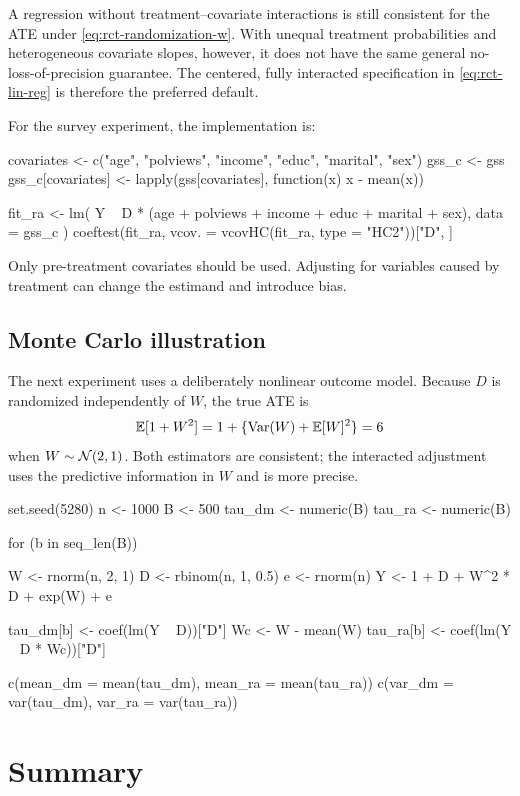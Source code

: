 A regression without treatment--covariate interactions is still consistent for the
ATE under \eqref{eq:rct-randomization-w}.  With unequal treatment probabilities and
heterogeneous covariate slopes, however, it does not have the same general
no-loss-of-precision guarantee.  The centered, fully interacted specification in
\eqref{eq:rct-lin-reg} is therefore the preferred default.

For the survey experiment, the implementation is:
\begin{rcode}
covariates <- c("age", "polviews", "income", "educ", "marital", "sex")
gss_c <- gss
gss_c[covariates] <- lapply(gss[covariates], function(x) x - mean(x))

fit_ra <- lm(
  Y ~ D * (age + polviews + income + educ + marital + sex),
  data = gss_c
)
coeftest(fit_ra, vcov. = vcovHC(fit_ra, type = "HC2"))["D", ]
\end{rcode}

Only pre-treatment covariates should be used.  Adjusting for variables caused by
treatment can change the estimand and introduce bias.

\subsection{Monte Carlo illustration}

The next experiment uses a deliberately nonlinear outcome model.  Because $D$ is
randomized independently of $W$, the true ATE is
\[
  \mathbb{E}[1+W^2]=1+\{\operatorname{Var}(W)+\mathbb{E}[W]^2\}=6
\]
when $W\sim\mathcal{N}(2,1)$.  Both estimators are consistent; the interacted adjustment uses
the predictive information in $W$ and is more precise.

\begin{rcode}
set.seed(5280)
n <- 1000
B <- 500
tau_dm <- numeric(B)
tau_ra <- numeric(B)

for (b in seq_len(B)) {
  W <- rnorm(n, 2, 1)
  D <- rbinom(n, 1, 0.5)
  e <- rnorm(n)
  Y <- 1 + D + W^2 * D + exp(W) + e

  tau_dm[b] <- coef(lm(Y ~ D))["D"]
  Wc <- W - mean(W)
  tau_ra[b] <- coef(lm(Y ~ D * Wc))["D"]
}

c(mean_dm = mean(tau_dm), mean_ra = mean(tau_ra))
c(var_dm = var(tau_dm), var_ra = var(tau_ra))
\end{rcode}

\section{Summary}

